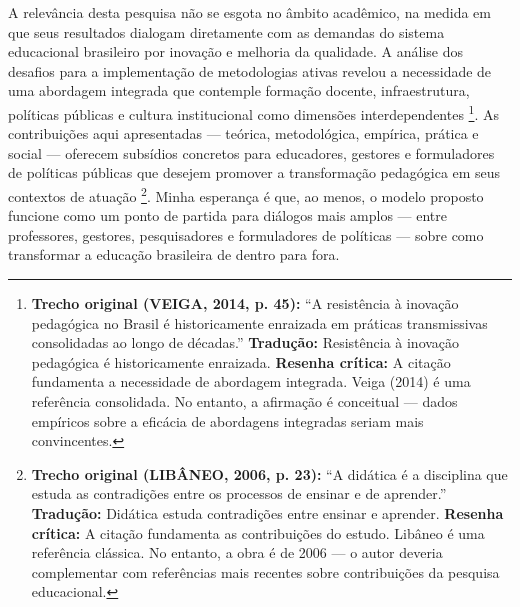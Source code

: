 A relevância desta pesquisa não se esgota no âmbito acadêmico, na medida em que seus resultados dialogam diretamente com as demandas do sistema educacional brasileiro por inovação e melhoria da qualidade. A análise dos desafios para a implementação de metodologias ativas revelou a necessidade de uma abordagem integrada que contemple formação docente, infraestrutura, políticas públicas e cultura institucional como dimensões interdependentes \cite{VEIGA2014}\footnote{\textbf{Trecho original (VEIGA, 2014, p. 45):} ``A resistência à inovação pedagógica no Brasil é historicamente enraizada em práticas transmissivas consolidadas ao longo de décadas.'' \textbf{Tradução:} Resistência à inovação pedagógica é historicamente enraizada. \textbf{Resenha crítica:} A citação fundamenta a necessidade de abordagem integrada. Veiga (2014) é uma referência consolidada. No entanto, a afirmação é conceitual — dados empíricos sobre a eficácia de abordagens integradas seriam mais convincentes.}. As contribuições aqui apresentadas — teórica, metodológica, empírica, prática e social — oferecem subsídios concretos para educadores, gestores e formuladores de políticas públicas que desejem promover a transformação pedagógica em seus contextos de atuação \cite{LIBANEO2006}\footnote{\textbf{Trecho original (LIBÂNEO, 2006, p. 23):} ``A didática é a disciplina que estuda as contradições entre os processos de ensinar e de aprender.'' \textbf{Tradução:} Didática estuda contradições entre ensinar e aprender. \textbf{Resenha crítica:} A citação fundamenta as contribuições do estudo. Libâneo é uma referência clássica. No entanto, a obra é de 2006 — o autor deveria complementar com referências mais recentes sobre contribuições da pesquisa educacional.}. Minha esperança é que, ao menos, o modelo proposto funcione como um ponto de partida para diálogos mais amplos — entre professores, gestores, pesquisadores e formuladores de políticas — sobre como transformar a educação brasileira de dentro para fora.

